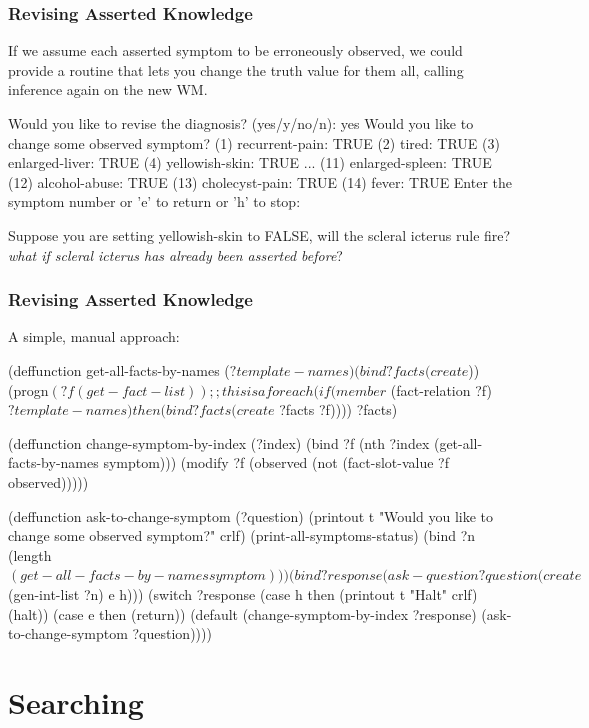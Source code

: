 \documentclass[xcolor={usenames,dvipsnames,svgnames}, compress]{beamer}
\begin{document}
\begin{frame}[fragile]
  \frametitle{Revising Asserted Knowledge}
  If we assume each asserted symptom to be erroneously observed, we
  could provide a routine that lets you change the truth value for
  them all, calling inference again on the new WM.\par
  \begin{clips-code}
    Would you like to revise the diagnosis? (yes/y/no/n): yes
    Would you like to change some observed symptom?
    (1) recurrent-pain: TRUE
    (2) tired: TRUE
    (3) enlarged-liver: TRUE
    (4) yellowish-skin: TRUE
    ...
    (11) enlarged-spleen: TRUE
    (12) alcohol-abuse: TRUE
    (13) cholecyst-pain: TRUE
    (14) fever: TRUE
    Enter the symptom number or 'e' to return or 'h' to stop:
  \end{clips-code}

  Suppose you are setting yellowish-skin to FALSE, will the scleral
  icterus rule fire? \emph{what if scleral icterus has already been asserted before}? 
\end{frame}

\begin{frame}[fragile]
  \frametitle{Revising Asserted Knowledge}
  A simple, manual approach:
  \begin{clips-code}
    (deffunction get-all-facts-by-names ($?template-names)
        (bind ?facts (create$))
        (progn$ (?f (get-fact-list)) ;; this is a foreach
            (if (member$ (fact-relation ?f) $?template-names)
                then (bind ?facts (create$ ?facts ?f)))) ?facts)
    
    (deffunction change-symptom-by-index (?index)
        (bind ?f (nth ?index (get-all-facts-by-names symptom)))
        (modify ?f (observed (not (fact-slot-value ?f observed)))))

    (deffunction ask-to-change-symptom (?question)
        (printout t "Would you like to change some observed symptom?" crlf)
        (print-all-symptoms-status)
        (bind ?n (length$ (get-all-facts-by-names symptom)))
        (bind ?response (ask-question ?question (create$ (gen-int-list ?n) e h)))
        (switch ?response  (case h then (printout t "Halt" crlf) (halt))
                           (case e then (return)) 
                           (default (change-symptom-by-index ?response)
        (ask-to-change-symptom ?question))))
  \end{clips-code}
\end{frame}

\section{Searching}
{
  \begin{frame}
    \sectionpage
  \end{frame}
}
\end{document}

